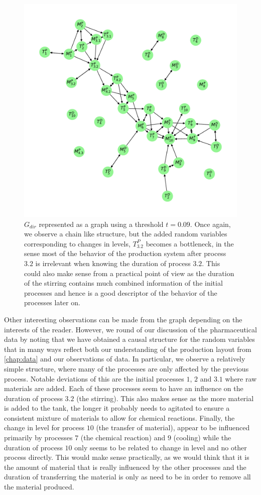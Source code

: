 \documentclass[../Thesis.tex]{subfiles}
\begin{document}
\begin{figure}[ht]
    \centering
    \includegraphics[width = .75\linewidth]{figures/Cycle data/G_dir times and levelchanges as graph - directed - 0_09.pdf}
    \caption{$G_{dir}$ represented as a graph using a threshold $t = 0.09$. Once again, we observe a chain like structure, but the added random variables corresponding to changes in levels, $T^P_{3.2}$ becomes a bottleneck, in the sense most of the behavior of the production system after process $3.2$ is irrelevant when knowing the duration of process $3.2$. This could also make sense from a practical point of view as the duration of the stirring contains much combined information of the initial processes and hence is a good descriptor of the behavior of the processes later on.}
    \label{fig:G_dir times and levelchanges - semidirected - as graph}
\end{figure}
Other interesting observations can be made from the graph depending on the interests of the reader. However, we round of our discussion of the pharmaceutical data by noting that we have obtained a causal structure for the random variables that in many ways reflect both our understanding of the production layout from \autoref{chap:data} and our observations of data. In particular, we observe a relatively simple structure, where many of the processes are only affected by the previous process. Notable deviations of this are the initial processes $1$, $2$ and $3.1$ where raw materials are added. Each of these processes seem to have an influence on the duration of process $3.2$ (the stirring). This also makes sense as the more material is added to the tank, the longer it probably needs to agitated to ensure a consistent mixture of materials to allow for chemical reactions. Finally, the change in level for process $10$ (the transfer of material), appear to be influenced primarily by processes $7$ (the chemical reaction) and $9$ (cooling) while the duration of process $10$ only seems to be related to change in level and no other process directly. This would make sense practically, as we would think that it is the amount of material that is really influenced by the other processes and the duration of transferring the material is only as need to be in order to remove all the material produced.
\end{document}
